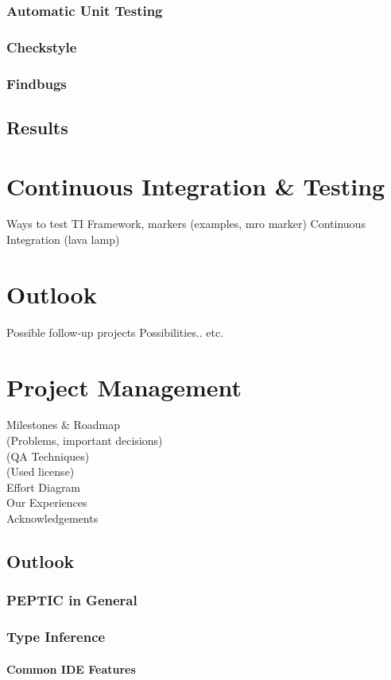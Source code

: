 \documentclass[12pt,halfparskip]{scrreprt}
\begin{document}
\subsection{Automatic Unit Testing}
\subsection{Checkstyle}
\subsection{Findbugs}
\section{Results}

\chapter{Continuous Integration \& Testing}
 Ways to test TI
 Framework, markers
  (examples, mro marker)
 Continuous Integration
  (lava lamp)

\chapter{Outlook}
 Possible follow-up projects
 Possibilities.. etc.

\chapter{Project Management}
 Milestones \& Roadmap \\
 (Problems, important decisions) \\
 (QA Techniques) \\
 (Used license) \\
 Effort Diagram \\
 Our Experiences \\
 Acknowledgements 

\section{Outlook}
\subsection{PEPTIC in General}
\subsection{Type Inference}
\subsubsection{Common IDE Features}
\end{document}

